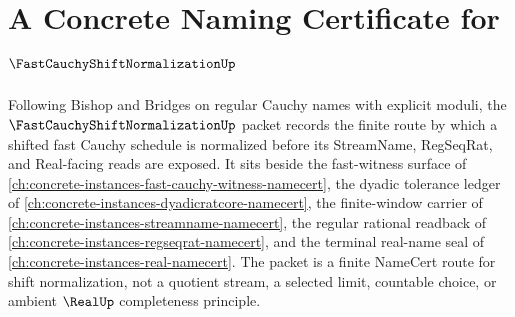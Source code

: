 \chapter{A Concrete Naming Certificate for $\FastCauchyShiftNormalizationUp$}
\label{ch:concrete-instances-fast-cauchy-shift-normalization-namecert}

Following Bishop and Bridges on regular Cauchy names with explicit moduli, the $\FastCauchyShiftNormalizationUp$ packet records the finite route by which a shifted fast Cauchy schedule is normalized before its StreamName, RegSeqRat, and Real-facing reads are exposed. It sits beside the fast-witness surface of \autoref{ch:concrete-instances-fast-cauchy-witness-namecert}, the dyadic tolerance ledger of \autoref{ch:concrete-instances-dyadicratcore-namecert}, the finite-window carrier of \autoref{ch:concrete-instances-streamname-namecert}, the regular rational readback of \autoref{ch:concrete-instances-regseqrat-namecert}, and the terminal real-name seal of \autoref{ch:concrete-instances-real-namecert}. The packet is a finite NameCert route for shift normalization, not a quotient stream, a selected limit, countable choice, or ambient $\RealUp$ completeness principle.

